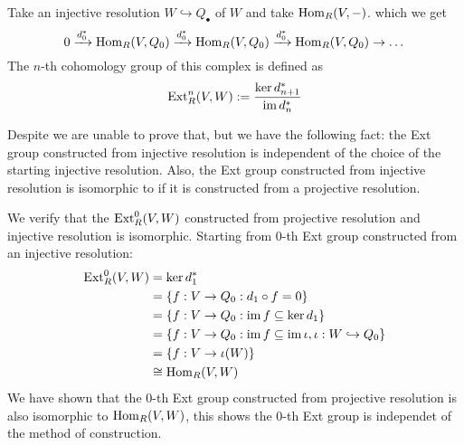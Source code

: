 \begin{defn} 
    Take an injective resolution $W\hookrightarrow Q_\bullet$ of $W$ and take $\operatorname{Hom}_R(V,-)$. which we get 
    \[0 \xrightarrow{d_0^*} \operatorname{Hom}_R(V,Q_0) \xrightarrow{d_0^*} \operatorname{Hom}_R(V,Q_0) \xrightarrow{d_0^*} \operatorname{Hom}_R(V,Q_0) \to \dots \]
    The $n$-th cohomology group of this complex is defined as 
    \[\operatorname{Ext}_R^n(V,W) := \frac{\ker d_{n+1}^*}{\operatorname{im} d_n^*}\]

\end{defn}

\medskip

\begin{re}
    Despite we are unable to prove that, but we have the following fact: the Ext group constructed from injective resolution is independent of the choice of the starting injective resolution. Also, the Ext group constructed from injective resolution is isomorphic to if it is constructed from a projective resolution.
\end{re}

\medskip

\begin{ex}
    We verify that the $\operatorname{Ext}^0_R(V,W)$ constructed from projective resolution and injective resolution is isomorphic. Starting from $0$-th Ext group constructed from an injective resolution:
    \begin{align*}
        \operatorname{Ext}_R^0(V,W) &= \ker d_1^* \\
        &= \left\{f:V\to Q_0:d_1\circ f = 0\right\}\\
        &= \left\{f:V\to Q_0:\operatorname{im} f\subseteq \ker d_1\right\}\\
        &= \left\{f:V\to Q_0 : \operatorname{im} f\subseteq \operatorname{im} \iota, \iota: W\hookrightarrow Q_0\right\}\\
        &= \left\{f:V\to \iota(W)\right\}\\
        &\cong \operatorname{Hom}_R(V,W)
    \end{align*}
    We have shown that the $0$-th Ext group constructed from projective resolution is also isomorphic to $\operatorname{Hom}_R(V,W)$, this shows the $0$-th Ext group is independet of the method of construction.
\end{ex}

\medskip

